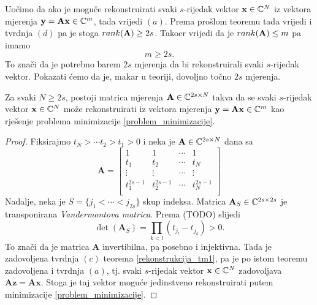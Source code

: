 \documentclass[a4paper,twoside,12pt]{memoir} %
\newcommand{\vect}[1]{\mathbf{#1}}
\renewcommand{\vec}{\vect}
\newcommand{\rank}{\text\normalfont{rank}}
\begin{document}
Uo\v{c}imo da ako je mogu\v{c}e rekonstruirati svaki $s$-rijedak vektor $\vec x \in \C^N$ iz vektora mjerenja $\vec y = \vec{Ax} \in \C^m$, tada vrijedi $(a)$. Prema pro\v{s}lom teoremu tada vrijedi i tvrdnja $(d)$ pa je stoga $\rank(\vec A) \geq 2s$. Tako\dj er vrijedi da je $\rank(\vec A) \leq m$ pa imamo 
\begin{equation*}
    m \geq 2s.    
\end{equation*}
To zna\v{c}i da je potrebno barem $2s$ mjerenja da bi rekonstruirali svaki $s$-rijedak vektor. Pokazati \'cemo da je, makar u teoriji, dovoljno to\v{c}no $2s$ mjerenja.

\begin{thm}
    Za svaki $N \geq 2s$, postoji matrica mjerenja $\vec A \in \C^{2s \times N}$ takva da se svaki $s$-rijedak vektor $\vec x \in \C^N$ mo\v{z}e rekonstruirati iz vektora mjerenja $\vec y = \vec{Ax} \in \C^m$ kao rje\v{s}enje problema minimizacije \eqref{problem_minimizacije}.
\end{thm}
\begin{proof}
    Fiksirajmo $t_N>\cdots t_2 > t_1 > 0$ i neka je $\vec A \in \C^{2s \times N}$ dana sa
    \begin{equation}\label{vandermont_matrica}
        \vec A = 
        \begin{bmatrix}
            1 & 1 & \cdots & 1 \\ 
            t_1 & t_2 & \cdots & t_N \\
            \vdots & \vdots & \cdots & \vdots \\
            t_1^{2s-1} & t_2^{2s-1} & \cdots & t_N^{2s-1} \\
        \end{bmatrix}
    \end{equation}
    Nadalje, neka je $S=\{j_1 < \cdots < j_{2s}\}$ skup indeksa. Matrica $\vec A_S \in \C^{2s \times 2s}$ je transponirana \textit{Vandermontova matrica}. Prema (TODO) slijedi
    \begin{equation*}
        \det(\vec{A}_S) = \prod_{k < l} (t_{j_l} - t_{j_k})>0.
    \end{equation*}
    To zna\v{c}i da je matrica $\vec A$ invertibilna, pa posebno i injektivna. Tada je zadovoljena tvrdnja $(c)$ teorema \eqref{rekonstrukcija_tm1}, pa je po istom teoremu zadovoljena i tvrdnja $(a)$, tj. svaki $s$-rijedak vektor $\vec x \in \C^N$ zadovoljava $\vec{Az}=\vec{Ax}$. Stoga je taj vektor mogu\'ce jedinstveno rekonstruirati putem minimizacije \eqref{problem_minimizacije}.
\end{proof}
\end{document}
